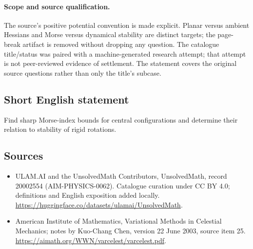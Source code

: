 \documentclass[11pt]{article}
\begin{document}
\paragraph{Scope and source qualification.}The source’s positive potential convention is made explicit. Planar versus ambient Hessians and Morse versus dynamical stability are distinct targets; the page-break artifact is removed without dropping any question. The catalogue title/status was paired with a machine-generated research attempt; that attempt is not peer-reviewed evidence of settlement. The statement covers the original source questions rather than only the title’s subcase.
\subsection{Short English statement}
Find sharp Morse-index bounds for central configurations and determine their relation to stability of rigid rotations.
\subsection{Sources}
\begin{itemize}
\item[\hypertarget{source:20002554:1}{S1}] ULAM.AI and the UnsolvedMath Contributors, UnsolvedMath, record 20002554 (AIM-PHYSICS-0062). Catalogue curation under CC BY 4.0; definitions and English exposition added locally.
\url{https://huggingface.co/datasets/ulamai/UnsolvedMath}.
\item[\hypertarget{source:20002554:2}{S2}] American Institute of Mathematics, Variational Methods in Celestial Mechanics; notes by Kuo-Chang Chen, version 22 June 2003, source item 25.
\url{https://aimath.org/WWN/varcelest/varcelest.pdf}.
\end{itemize}
\label{end:20002554}
\end{document}
